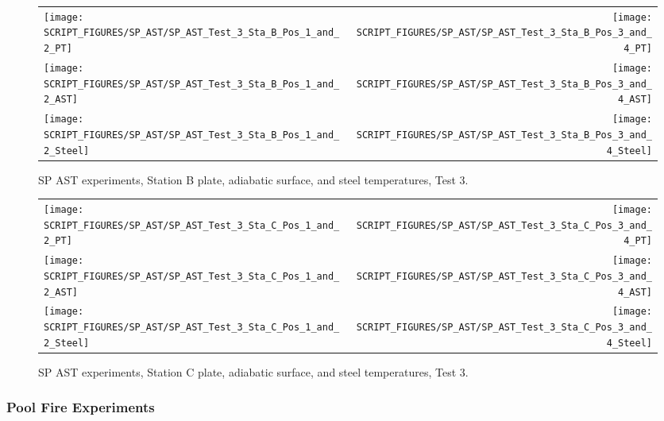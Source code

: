 \begin{figure}[p]
\begin{tabular*}{\textwidth}{l@{\extracolsep{\fill}}r}
\texttt{[image: SCRIPT\_FIGURES/SP\_AST/SP\_AST\_Test\_3\_Sta\_B\_Pos\_1\_and\_2\_PT]} &
\texttt{[image: SCRIPT\_FIGURES/SP\_AST/SP\_AST\_Test\_3\_Sta\_B\_Pos\_3\_and\_4\_PT]} \\
\texttt{[image: SCRIPT\_FIGURES/SP\_AST/SP\_AST\_Test\_3\_Sta\_B\_Pos\_1\_and\_2\_AST]} &
\texttt{[image: SCRIPT\_FIGURES/SP\_AST/SP\_AST\_Test\_3\_Sta\_B\_Pos\_3\_and\_4\_AST]} \\
\texttt{[image: SCRIPT\_FIGURES/SP\_AST/SP\_AST\_Test\_3\_Sta\_B\_Pos\_1\_and\_2\_Steel]} &
\texttt{[image: SCRIPT\_FIGURES/SP\_AST/SP\_AST\_Test\_3\_Sta\_B\_Pos\_3\_and\_4\_Steel]}
\end{tabular*}
\caption[SP AST experiments, Station B plate, adiabatic surface, and steel temperatures, Test 3]{SP AST experiments, Station B plate, adiabatic surface, and steel temperatures, Test 3.}
\label{SP_Test_3_Station_B}
\end{figure}

\begin{figure}[p]
\begin{tabular*}{\textwidth}{l@{\extracolsep{\fill}}r}
\texttt{[image: SCRIPT\_FIGURES/SP\_AST/SP\_AST\_Test\_3\_Sta\_C\_Pos\_1\_and\_2\_PT]} &
\texttt{[image: SCRIPT\_FIGURES/SP\_AST/SP\_AST\_Test\_3\_Sta\_C\_Pos\_3\_and\_4\_PT]} \\
\texttt{[image: SCRIPT\_FIGURES/SP\_AST/SP\_AST\_Test\_3\_Sta\_C\_Pos\_1\_and\_2\_AST]} &
\texttt{[image: SCRIPT\_FIGURES/SP\_AST/SP\_AST\_Test\_3\_Sta\_C\_Pos\_3\_and\_4\_AST]} \\
\texttt{[image: SCRIPT\_FIGURES/SP\_AST/SP\_AST\_Test\_3\_Sta\_C\_Pos\_1\_and\_2\_Steel]} &
\texttt{[image: SCRIPT\_FIGURES/SP\_AST/SP\_AST\_Test\_3\_Sta\_C\_Pos\_3\_and\_4\_Steel]}
\end{tabular*}
\caption[SP AST experiments, Station C plate, adiabatic surface, and steel temperatures, Test 3]{SP AST experiments, Station C plate, adiabatic surface, and steel temperatures, Test 3.}
\label{SP_Test_3_Station_C}
\end{figure}

\clearpage

\subsubsection{Pool Fire Experiments}

